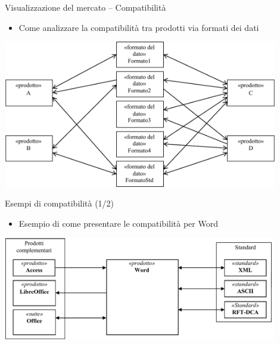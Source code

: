 \documentclass{beamer}
\begin{document}
\begin{frame}
{\centerline{Visualizzazione del mercato -- Compatibilit\`{a}}}
\begin{itemize}
    \item Come analizzare la compatibilit\`{a} tra prodotti via formati dei dati
\end{itemize} 
\begin{center}
    \includegraphics[width=0.9\textwidth]{A2023.IDSEPC.ConcettoDiSoftware/CompatibilitaProdotti.pdf}
\end{center}

\end{frame}
\begin{frame}
{\centerline{Esempi di compatibilit\`{a} (1/2)}}
\begin{itemize}
    \item Esempio di come presentare le compatibilit\`{a} per Word
\end{itemize} 
\begin{center}
    \includegraphics[width=0.9\textwidth]{A2023.IDSEPC.ConcettoDiSoftware/EsempiCompatibilita.1.pdf}
\end{center}

\end{frame}
\end{document}
